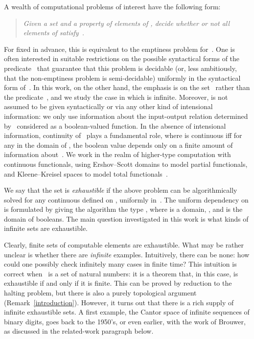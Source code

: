 \documentclass{LMCS}
\begin{document}
\noindent
A wealth of computational problems of interest have the following
form:
\begin{quote}
  \em Given a set  and a property  of elements of , decide
  whether or not \emph{all} elements of  satisfy~.
\end{quote}
For  fixed in advance, this is equivalent to the emptiness problem
for~. One is often interested in suitable restrictions on the
possible syntactical forms of the predicate~ that guarantee that
this problem is decidable (or, less ambitiously, that the
non-emptiness problem is semi-decidable) uniformly in the syntactical
form of~. 
In this work, on the other hand, the emphasis is on the set~ rather
than the predicate~, and we study the case in which  is
infinite. Moreover,  is not assumed to be given syntactically or
via any other kind of intensional information: we only use information
about the input-output relation determined by~ considered as a
boolean-valued function.
In the absence of intensional information, continuity of~ plays a
fundamental role, where  is continuous iff for any  in the
domain of , the boolean value  depends only on a finite
amount of information about~.  We work in the realm of higher-type
computation with continuous functionals, using Ershov--Scott domains
to model partial functionals, and Kleene--Kreisel spaces to model
total functionals~\cite{normann:computer,normann:recursion}.

\pagebreak[3]
We say that the set  is \emph{exhaustible} if the above problem can
be algorithmically solved for any continuous  defined on ,
uniformly in~. The uniform dependency on  is formulated by
giving the algorithm the type , where 
is a domain, , and  is the domain of booleans.
The main question investigated in this work is what kinds of infinite
sets are exhaustible.

Clearly, finite sets of computable elements are exhaustible. What may
be rather unclear is whether there are \emph{infinite} examples.
Intuitively, there can be none: how could one possibly check
infinitely many cases in finite time? This intuition is correct
when~ is a set of natural numbers: it is a theorem that, in this
case,  is exhaustible if and only if it is finite.  This can be
proved by reduction to the halting problem, but there is also a purely
topological argument (Remark~\ref{introduction}).  However, it turns
out that there is a rich supply of infinite exhaustible sets. A first
example, the Cantor space of infinite sequences of binary digits, goes
back to the 1950's, or even earlier, with the work of Brouwer, as
discussed in the related-work paragraph below.
\end{document}
